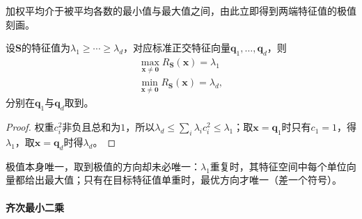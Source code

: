 加权平均介于被平均各数的最小值与最大值之间，由此立即得到两端特征值的极值刻画。
\begin{theorem}
\label{thm:matrix-analysis-rayleigh-ritz}
\label{eq:matrix-analysis-rayleigh-ritz}
设$\bm S$的特征值为$\lambda_1\geq\cdots\geq\lambda_d$，对应标准正交特征向量$\bm q_1,\ldots,\bm q_d$，则
\begin{equation*}
\begin{gathered}
\max_{\bm x\neq\bm0}R_{\bm S}(\bm x)=\lambda_1\\
\min_{\bm x\neq\bm0}R_{\bm S}(\bm x)=\lambda_d,
\end{gathered}
\end{equation*}
分别在$\bm q_1$与$\bm q_d$取到。
\end{theorem}
\begin{proof}
权重$c_i^2$非负且总和为$1$，所以$\lambda_d\leq\sum_i\lambda_ic_i^2\leq\lambda_1$；取$\bm x=\bm q_1$时只有$c_1=1$，得$\lambda_1$，取$\bm x=\bm q_d$时得$\lambda_d$。
\end{proof}
极值本身唯一，取到极值的方向却未必唯一：$\lambda_1$重复时，其特征空间中每个单位向量都给出最大值；只有在目标特征值单重时，最优方向才唯一（差一个符号）。

\paragraph{齐次最小二乘}
\label{sec:linear-algebra-homogeneous-estimation}

